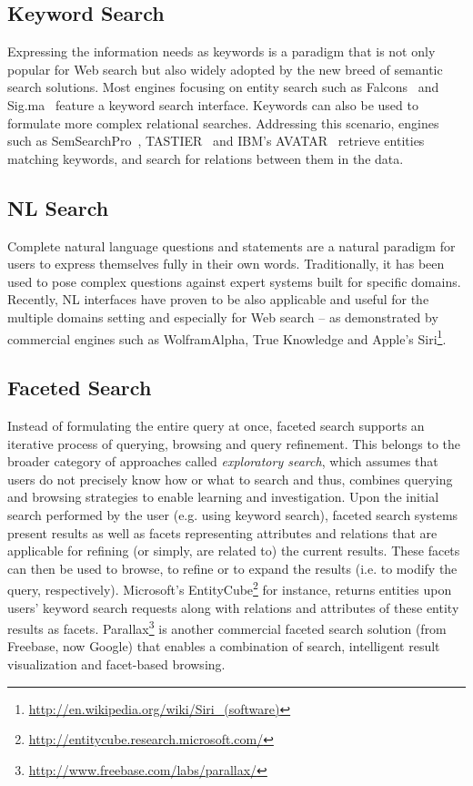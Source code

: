 \subsection{Keyword Search} Expressing the information needs as keywords is a paradigm that is not only popular for Web search but also widely adopted by the new breed of semantic search solutions. Most engines focusing on entity search such as Falcons~\cite{DBLP:journals/ijswis/ChengQ09} and Sig.ma~\cite{DBLP:journals/ws/TummarelloCCDDD10} feature a keyword search interface. Keywords can also be used to formulate more complex relational searches. Addressing this scenario, engines such as SemSearchPro~\cite{DBLP:journals/ws/TranHL11}, TASTIER~\cite{DBLP:conf/sigmod/LiJLF0} and IBM's AVATAR~\cite{DBLP:conf/sigmod/KandoganKRVZ06} retrieve entities matching keywords, and search for relations between them in the data. 
	
	
\subsection{NL Search} Complete natural language questions and statements are a natural paradigm for users to express themselves fully in their own words. Traditionally, it has been used to pose complex questions against expert systems built for specific domains. Recently, NL interfaces have proven to be also applicable and useful for the multiple domains setting and especially for Web search -- as demonstrated by commercial engines such as WolframAlpha, True Knowledge and Apple's Siri\footnote{\url{http://en.wikipedia.org/wiki/Siri_(software)}}. 	
	

\subsection{Faceted Search} Instead of formulating the entire query at once, faceted search supports an iterative process of querying, browsing and query refinement. This belongs to the broader category of approaches called \emph{exploratory search}, which assumes that users do not precisely know how or what to search and thus, combines querying and browsing strategies to enable learning and investigation. Upon the initial search performed by the user (e.g. using keyword search), faceted search systems~\cite{DBLP:conf/dexa/WagnerLT11,DBLP:conf/semweb/FerreH11,DBLP:conf/esws/HeimEZ10} present results as well as facets representing attributes and relations that are applicable for refining (or simply, are related to) the current results. These facets can then be used to browse, to refine or to expand the results (i.e. to modify the query, respectively). Microsoft's EntityCube\footnote{\url{http://entitycube.research.microsoft.com/}} for instance, returns entities upon users' keyword search requests along with relations and attributes of these entity results as facets. Parallax\footnote{\url{http://www.freebase.com/labs/parallax/}} is another commercial faceted search solution (from Freebase, now Google) that enables a combination of search, intelligent result visualization and facet-based browsing. 

